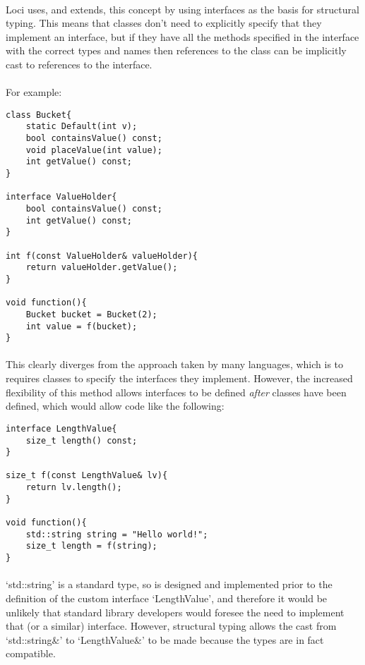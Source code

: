 \documentclass[12pt,twoside,notitlepage]{report}
\begin{document}
\paragraph{}
Loci uses, and extends, this concept by using interfaces as the basis for structural typing. This means that classes don't need to explicitly specify that they implement an interface, but if they have all the methods specified in the interface with the correct types and names then references to the class can be implicitly cast to references to the interface.

\paragraph{}
For example:


\begin{lstlisting}
class Bucket{
	static Default(int v);
	bool containsValue() const;
	void placeValue(int value);
	int getValue() const;
}

interface ValueHolder{
	bool containsValue() const;
	int getValue() const;
}

int f(const ValueHolder& valueHolder){
	return valueHolder.getValue();
}

void function(){
	Bucket bucket = Bucket(2);
	int value = f(bucket);
}
\end{lstlisting}


\paragraph{}
This clearly diverges from the approach taken by many languages, which is to requires classes to specify the interfaces they implement. However, the increased flexibility of this method allows interfaces to be defined \emph{after} classes have been defined, which would allow code like the following:


\begin{lstlisting}
interface LengthValue{
	size_t length() const;
}

size_t f(const LengthValue& lv){
	return lv.length();
}

void function(){
	std::string string = "Hello world!";
	size_t length = f(string);
}
\end{lstlisting}


\paragraph{}
`std::string' is a standard type, so is designed and implemented prior to the definition of the custom interface `LengthValue', and therefore it would be unlikely that standard library developers would foresee the need to implement that (or a similar) interface. However, structural typing allows the cast from `std::string\&' to `LengthValue\&' to be made because the types are in fact compatible.
\end{document}
